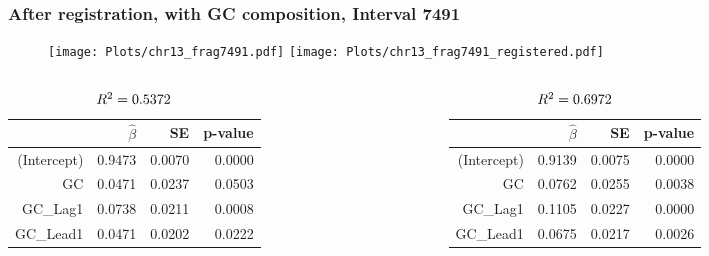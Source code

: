 \documentclass[10pt,dvipsnames,table]{beamer}
\begin{document}
\begin{frame}
\frametitle{After registration, with GC composition, Interval 7491}
\vspace{-0.25cm}
\begin{figure}[t]
\texttt{[image: Plots/chr13\_frag7491.pdf]}
\hspace{0.5cm}
\texttt{[image: Plots/chr13\_frag7491\_registered.pdf]}
\end{figure}
\vspace{-0.5cm}

\begin{columns}
\begin{column}{0.5\textwidth}
\begin{table}[ht]
\centering
{\footnotesize{
\begin{tabular}{rrrr}
  \hline
  & $\hat{\beta}$ & SE & p-value \\ 
  \hline
  (Intercept) & 0.9473 & 0.0070 & 0.0000 \\ 
  GC & 0.0471 & 0.0237 & 0.0503 \\ 
  GC\_Lag1 & 0.0738 & 0.0211 & 0.0008 \\ 
  GC\_Lead1 & 0.0471 & 0.0202 & 0.0222 \\ 
  \hline
\end{tabular}
\caption{$\tiny{R^2 = 0.5372}$}
}}
\end{table}

\end{column}

\begin{column}{0.5\textwidth}
\begin{table}[ht]
\centering
{\footnotesize{
\begin{tabular}{rrrr}
  \hline
  & $\hat{\beta}$ & SE & p-value \\ 
  \hline
  (Intercept) & 0.9139 & 0.0075 & 0.0000 \\ 
  GC & 0.0762 & 0.0255 & 0.0038 \\ 
  GC\_Lag1 & 0.1105 & 0.0227 & 0.0000 \\ 
  GC\_Lead1 & 0.0675 & 0.0217 & 0.0026 \\ 
  \hline
\end{tabular}
\caption{$\tiny{R^2 = 0.6972}$}
}}
\end{table}

\end{column}
\end{columns}
\end{frame}
\end{document}

